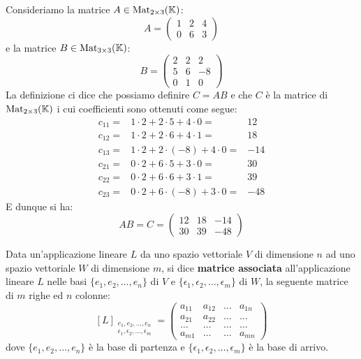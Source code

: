 \begin{example}
	Consideriamo la matrice $A \in \operatorname{Mat}_{2 \times 3}(\mathbb{K})$:
	\[
		A = \begin{pmatrix}
			1 & 2 & 4 \\
			0 & 6 & 3
		\end{pmatrix}
	\]
	e la matrice $B \in \operatorname{Mat}_{3 \times 3}(\mathbb{K})$:
	\[
		B = \begin{pmatrix}
			2 & 2 & 2  \\
			5 & 6 & -8 \\
			0 & 1 & 0
		\end{pmatrix}
	\]
	La definizione ci dice che possiamo definire $C = AB$ e che $C$ è la matrice di $\operatorname{Mat}_{2 \times 3}(\mathbb{K})$
	i cui coefficienti sono ottenuti come segue:
	\begin{align*}
		c_{11} = & 1 \cdot 2 + 2 \cdot 5 + 4 \cdot 0 =    & 12  \\
		c_{12} = & 1 \cdot 2 + 2 \cdot 6 + 4 \cdot 1 =    & 18  \\
		c_{13} = & 1 \cdot 2 + 2 \cdot (-8) + 4 \cdot 0 = & -14 \\
		c_{21} = & 0 \cdot 2 + 6 \cdot 5 + 3 \cdot 0 =    & 30  \\
		c_{22} = & 0 \cdot 2 + 6 \cdot 6 + 3 \cdot 1 =    & 39  \\
		c_{23} = & 0 \cdot 2 + 6 \cdot (-8) + 3 \cdot 0 = & -48
	\end{align*}
	E dunque si ha:
	\[
		AB = C = \begin{pmatrix}
			12 & 18 & -14 \\
			30 & 39 & -48
		\end{pmatrix}
	\]
\end{example}

\begin{definition}
	Data un'applicazione lineare $L$ da uno spazio vettoriale $V$ di dimensione $n$ ad uno spazio vettoriale
	$W$ di dimensione $m$, si dice \textbf{matrice associata} all'applicazione lineare $L$ nelle basi
	$\{e_1, e_2, \dots, e_n\}$ di $V$ e $\{\epsilon_1, \epsilon_2, \dots, \epsilon_m\}$ di $W$, la seguente
	matrice di $m$ righe ed $n$ colonne:
	\[
		[L]_{\substack{
					e_1, e_2, \dots, e_n\\
					\epsilon_1, \epsilon_2, \dots, \epsilon_m
				}} = \begin{pmatrix}
			a_{11} & a_{12} & \dots & a_{1n} \\
			a_{21} & a_{22} & \dots & \dots  \\
			\dots  & \dots  & \dots & \dots  \\
			a_{m1} & \dots  & \dots & a_{mn}
		\end{pmatrix}
	\]
	dove $\{e_1, e_2, \dots, e_n\}$ è la base di partenza e $\{\epsilon_1, \epsilon_2, \dots, \epsilon_m\}$ è
	la base di arrivo.
\end{definition}

